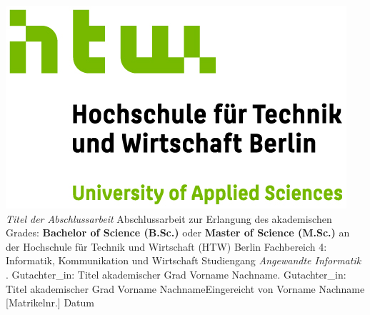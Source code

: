 \documentclass[oneside,bibliography=totocnumbered,BCOR=5mm]{scrbook}%
\theoremstyle{definition}
\theoremstyle{definition}
\theoremstyle{definition}
\theoremstyle{definition}
\theoremstyle{definition}
\theoremstyle{definition}
\begin{document}
\begin{titlepage}
\begin{center}
\includegraphics{HTW_Berlin_Logo_farbig.jpg}
\linebreak[4]
\linebreak[4]
\linebreak[4]
\linebreak[4]
\textit{\large Titel der Abschlussarbeit}
\linebreak[4]
\linebreak[4]
\linebreak[4]
Abschlussarbeit 
\linebreak[4]
\linebreak[4]
zur Erlangung des akademischen Grades: 
\linebreak[4]
\linebreak[4]
\textbf{Bachelor of Science (B.Sc.)} oder \textbf{Master of Science (M.Sc.)}
\linebreak[4]
\linebreak[4]
an der
\linebreak[4]
\linebreak[4]
Hochschule f\"ur Technik und Wirtschaft (HTW) Berlin
\linebreak[4]
Fachbereich 4: Informatik, Kommunikation und Wirtschaft
\linebreak[4]
Studiengang \textit{Angewandte Informatik}
\linebreak[4]
\linebreak[4]
. Gutachter\_in: Titel akademischer Grad Vorname Nachname. Gutachter\_in: Titel akademischer Grad Vorname Nachname\linebreak[4]
\linebreak[4]
\linebreak[4]
\linebreak[4]
\linebreak[4]
Eingereicht von Vorname Nachname [Matrikelnr.]
\linebreak[4]
\linebreak[4]
\linebreak[4]
\linebreak[4]
Datum
\linebreak[4]


\end{center}
\end{titlepage}
\end{document}

